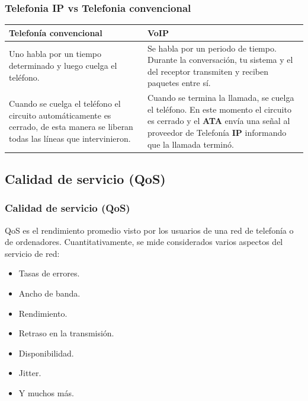 \documentclass{beamer}
\begin{document}
\begin{frame}
\frametitle{Telefonia IP vs Telefonia convencional}
\begin{tabular}{|p{5.5cm}|p{5.5cm}|}
				\hline
		\textbf{Telefonía convencional} & \textbf{VoIP} \\
		\hline \hline
		Uno habla por un tiempo determinado y luego cuelga el teléfono. & Se habla por un periodo de tiempo. Durante la conversación, tu sistema y el del receptor transmiten y reciben paquetes entre sí. \\
		\hline
		Cuando se cuelga el teléfono el circuito automáticamente es cerrado, de esta manera se liberan todas las líneas que intervinieron. & Cuando se termina la llamada, se cuelga el teléfono. En este momento el circuito es cerrado y el \textbf{ATA} envía una señal al proveedor de Telefonía \textbf{IP} informando que la llamada terminó. \\
		\hline
\end{tabular}
\end{frame}
\subsection{Calidad de servicio (QoS)}
\begin{frame}
\frametitle{Calidad de servicio (QoS)}
		QoS es el rendimiento promedio visto por los usuarios de una red de telefonía o de ordenadores. Cuantitativamente, se mide considerados varios aspectos del servicio de red:
		\begin{itemize}
			\item Tasas de errores.
			\item Ancho de banda.
			\item Rendimiento.
			\item Retraso en la transmisión.
			\item Disponibilidad.
			\item Jitter.
			\item Y muchos más.
		\end{itemize}
\end{frame}
\end{document}
